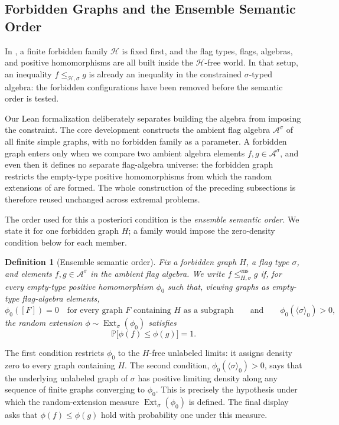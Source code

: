 \documentclass[acmsmall,screen=true,acmthm=false]{acmart}
\newtheorem{definition}[definition]{Definition}
\newcommand{\Ext}{\operatorname{Ext}}
\begin{document}
\subsection{Forbidden Graphs and the Ensemble Semantic Order}
\label{sec:forbidden}

In , a finite forbidden family \(\mathcal{H}\) is fixed
first, and the flag types, flags, algebras, and positive homomorphisms are all
built inside the \(\mathcal{H}\)-free world.  In that setup, an inequality
\(f\leq_{\mathcal{H},\sigma} g\) is already an inequality in the constrained
\(\sigma\)-typed algebra: the forbidden configurations have been removed
before the semantic order is tested.

Our Lean formalization deliberately separates building the algebra from
imposing the constraint.  The core development constructs the ambient flag
algebra \(\mathcal{A}^\sigma\) of all finite simple graphs, with no forbidden
family as a parameter.  A forbidden graph enters only when we compare two
ambient algebra elements \(f,g\in\mathcal{A}^\sigma\), and even then it defines
no separate flag-algebra universe: the forbidden graph restricts the
empty-type positive homomorphisms from which the random extensions of
 are formed.  The whole construction of the
preceding subsections is therefore reused unchanged across extremal problems.

The order used for this a posteriori condition is the
\emph{ensemble semantic order}.  We state it for one forbidden graph \(H\); a
family would impose the zero-density condition below for each member.

\begin{definition}[Ensemble semantic order]\label{def:ensemble-semantic-order}
Fix a forbidden graph \(H\), a flag type \(\sigma\), and elements
\(f,g\in\mathcal{A}^\sigma\) in the ambient flag algebra.  We write
\(f\leq^{\mathrm{ens}}_{H,\sigma} g\) if, for every empty-type positive
homomorphism \(\phi_0\) such that, viewing graphs as
empty-type flag-algebra elements,
\[
  \phi_0([F])=0
  \quad\text{for every graph \(F\) containing \(H\) as a subgraph}
  \qquad\text{and}\qquad
  \phi_0(\langle\sigma\rangle_0)>0,
\]
the random extension \(\phi\sim\Ext_\sigma(\phi_0)\) satisfies
\[
  \mathbb{P}\bigl[\phi(f)\leq\phi(g)\bigr]=1.
\]
\end{definition}

The first condition restricts \(\phi_0\) to the \(H\)-free unlabeled limits: it
assigns density zero to every graph containing \(H\).  The second condition,
\(\phi_0(\langle\sigma\rangle_0)>0\), says that the underlying unlabeled graph of
\(\sigma\) has positive limiting density along any sequence of finite
graphs converging to \(\phi_0\).  This is precisely the hypothesis under which the random-extension
measure \(\Ext_\sigma(\phi_0)\) is defined.  The final display asks that
\(\phi(f)\leq\phi(g)\) hold with probability one under this measure.
\end{document}
